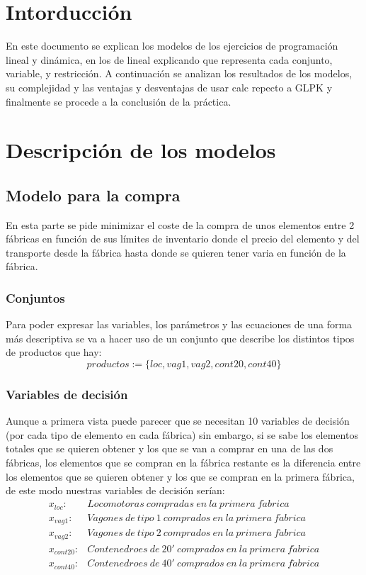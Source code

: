 \documentclass[11pt,spanish]{article}
\begin{document}


	\section{Intorducción}
	En este documento se explican los modelos de los ejercicios de programación lineal y dinámica, en los de lineal explicando que representa cada conjunto, variable, y restricción. A continuación se analizan los resultados de los modelos, su complejidad y las ventajas y desventajas de usar calc repecto a GLPK y finalmente se procede a la conclusión de la práctica.

	\section{Descripción de los modelos}
		\subsection{Modelo para la compra}
			En esta parte se pide minimizar el coste de la compra de unos elementos entre 2 fábricas en función de sus límites de inventario donde el precio del elemento y del transporte desde la fábrica hasta donde se quieren tener varia en función de la fábrica.
			\subsubsection{Conjuntos}
			Para poder expresar las variables, los parámetros y las ecuaciones de una forma más descriptiva se va a hacer uso de un conjunto que describe los distintos tipos de productos que hay:
			$$ productos := \{loc, vag1, vag2, cont20, cont40\} $$
			\subsubsection{Variables de decisión}
			Aunque a primera vista puede parecer que se necesitan 10 variables de decisión (por cada tipo de elemento en cada fábrica) sin embargo, si se sabe los elementos totales que se quieren obtener y los que se van a comprar en una de las dos fábricas, los elementos que se compran en la fábrica restante es la diferencia entre los elementos que se quieren obtener y los que se compran en la primera fábrica, de este modo nuestras variables de decisión serían:
			\begin{align*}
			x_{loc}:& Locomotoras\ compradas\ en\ la\ primera\ f\acute{a}brica \\
			x_{vag1}:& Vagones\ de\ tipo\ 1\ comprados\ en\ la\ primera\ f\acute{a}brica \\
			x_{vag2}:& Vagones\ de\ tipo\ 2\ comprados\ en\ la\ primera\ f\acute{a}brica \\
			x_{cont20}:& Contenedroes\ de\ 20'\ comprados\ en\ la\ primera\ f\acute{a}brica \\
			x_{cont40}:& Contenedroes\ de\ 40'\ comprados\ en\ la\ primera\ f\acute{a}brica 
			\end{align*}
			
\end{document}

